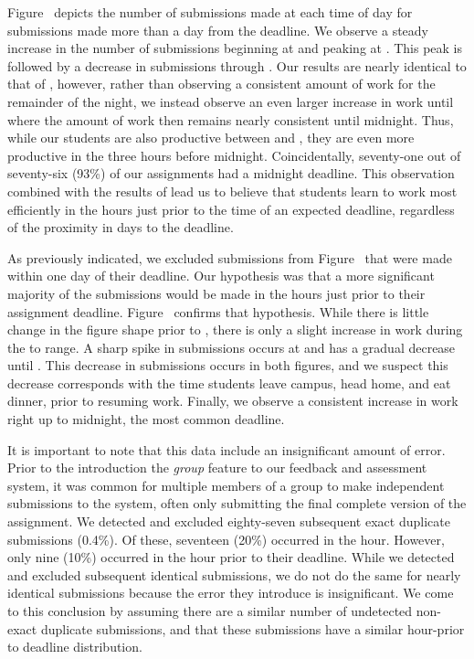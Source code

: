 Figure~ depicts the number of submissions made at
each time of day for submissions made more than a day from the deadline. We
observe a steady increase in the number of submissions beginning at  and
peaking at . This peak is followed by a decrease in submissions through
. Our results are nearly identical to that of \spacco{}, however, rather
than observing a consistent amount of work for the remainder of the night, we
instead observe an even larger increase in work until  where the amount
of work then remains nearly consistent until midnight. Thus, while our students
are also productive between  and , they are even more productive in
the three hours before midnight. Coincidentally, seventy-one out of seventy-six
(93\%) of our assignments had a midnight deadline. This observation combined
with the results of \spacco{} lead us to believe that students learn to work
most efficiently in the hours just prior to the time of an expected deadline,
regardless of the proximity in days to the deadline.

As previously indicated, we excluded submissions from
Figure~ that were made within one day of their
deadline. Our hypothesis was that a more significant majority of the
submissions would be made in the hours just prior to their assignment
deadline. Figure~ confirms that hypothesis. While
there is little change in the figure shape prior to , there is only a
slight increase in work during the  to  range. A sharp spike in
submissions occurs at  and has a gradual decrease until . This
decrease in submissions occurs in both figures, and we suspect this decrease
corresponds with the time students leave campus, head home, and eat dinner,
prior to resuming work. Finally, we observe a consistent increase in work right
up to midnight, the most common deadline.

It is important to note that this data include an insignificant amount of
error. Prior to the introduction the \emph{group} feature to our feedback and
assessment system, it was common for multiple members of a group to make
independent submissions to the system, often only submitting the final complete
version of the assignment. We detected and excluded eighty-seven subsequent
exact duplicate submissions (0.4\%). Of these, seventeen (20\%) occurred in the
 hour. However, only nine (10\%) occurred in the hour prior to their
deadline. While we detected and excluded subsequent identical submissions, we
do not do the same for nearly identical submissions because the error they
introduce is insignificant. We come to this conclusion by assuming there are a
similar number of undetected non-exact duplicate submissions, and that these
submissions have a similar hour-prior to deadline distribution.

